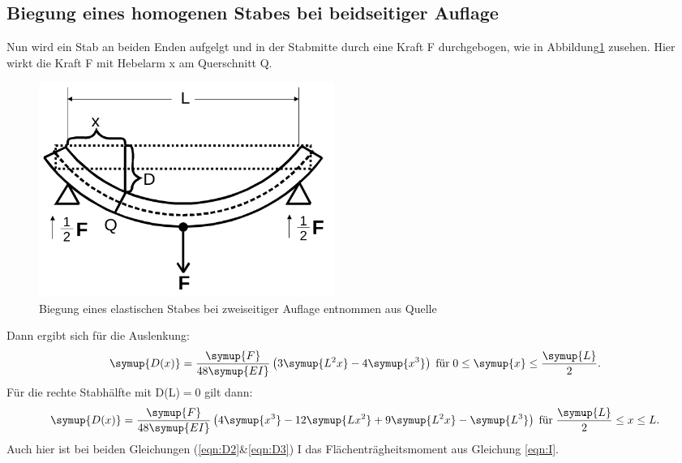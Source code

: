 \subsection{Biegung eines homogenen Stabes bei beidseitiger Auflage}
\label{sec:T2}
Nun wird ein Stab an beiden Enden aufgelgt und in der Stabmitte
durch eine Kraft F durchgebogen, wie in Abbildung\ref{fig:abb5} zusehen. Hier
wirkt die Kraft F mit Hebelarm x am Querschnitt Q.
\begin{figure}
  \centering
  \includegraphics[height= 7cm]{logos/Abb5.png}
  \caption{Biegung eines elastischen Stabes bei zweiseitiger Auflage
  entnommen aus Quelle \cite{Anleitung} }
  \label{fig:abb5}
\end{figure}
\FloatBarrier
Dann ergibt sich für die Auslenkung:
\begin{equation}
  \symup{D(x)} = \frac{\symup{F}}{48 \symup{EI}}
  \left( 3\symup{L^2 x}-4\symup{x^3} \right) \; \text{für} \;
  0 \leq \symup{x} \leq \frac{\symup{L}}{2} .
  \label{eqn:D2}
\end{equation}
Für die rechte Stabhälfte mit D(L)$=$0 gilt dann:
\begin{equation}
  \symup{D(x)} = \frac{\symup{F}}{48 \symup{EI}}
  \left(4 \symup{x^3} - 12\symup{Lx^2} + 9\symup{L^2x} - \symup{L^3}\right)
  \; \text{für} \; \frac{\symup{L}}{2} \leq x \leq L .
  \label{eqn:D3}
\end{equation}
Auch hier ist bei beiden Gleichungen (\eqref{eqn:D2}\&\eqref{eqn:D3}) I das
Flächenträgheitsmoment aus Gleichung \eqref{eqn:I}.



























%
